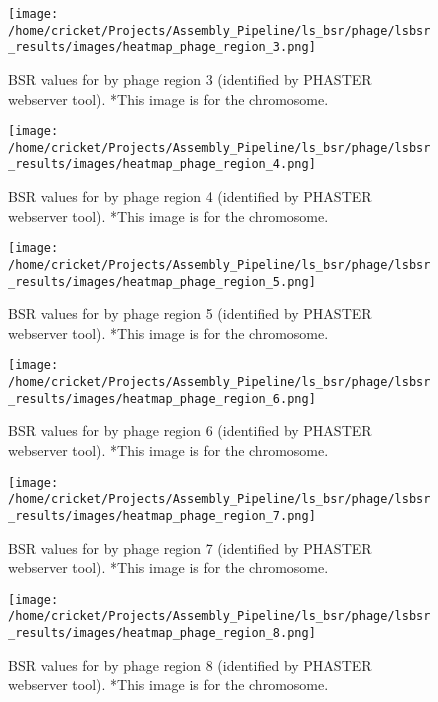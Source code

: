 \documentclass[11pt]{article}
\begin{document}
\begin{figure}[ht!]\normalsize %
\centering
\texttt{[image: /home/cricket/Projects/Assembly\_Pipeline/ls\_bsr/phage/lsbsr\_results/images/heatmap\_phage\_region\_3.png]} 
\caption{BSR values for by phage region 3 (identified by PHASTER webserver tool). *This image is for the chromosome.}
\label{phage_3}
\end{figure}

\clearpage

\begin{figure}[ht!]\normalsize %
\centering
\texttt{[image: /home/cricket/Projects/Assembly\_Pipeline/ls\_bsr/phage/lsbsr\_results/images/heatmap\_phage\_region\_4.png]} 
\caption{BSR values for by phage region 4 (identified by PHASTER webserver tool). *This image is for the chromosome.}
\label{phage_4}
\end{figure}

\begin{figure}[ht!]\normalsize %
\centering
\texttt{[image: /home/cricket/Projects/Assembly\_Pipeline/ls\_bsr/phage/lsbsr\_results/images/heatmap\_phage\_region\_5.png]} 
\caption{BSR values for by phage region 5 (identified by PHASTER webserver tool). *This image is for the chromosome.}
\label{phage_5}
\end{figure}

\clearpage

\begin{figure}[ht!]\normalsize %
\centering
\texttt{[image: /home/cricket/Projects/Assembly\_Pipeline/ls\_bsr/phage/lsbsr\_results/images/heatmap\_phage\_region\_6.png]} 
\caption{BSR values for by phage region 6 (identified by PHASTER webserver tool). *This image is for the chromosome.}
\label{phage_6}
\end{figure}

\begin{figure}[ht!]\normalsize %
\centering
\texttt{[image: /home/cricket/Projects/Assembly\_Pipeline/ls\_bsr/phage/lsbsr\_results/images/heatmap\_phage\_region\_7.png]} 
\caption{BSR values for by phage region 7 (identified by PHASTER webserver tool). *This image is for the chromosome.}
\label{phage_7}
\end{figure}

\clearpage

\begin{figure}[ht!]\normalsize %
\centering
\texttt{[image: /home/cricket/Projects/Assembly\_Pipeline/ls\_bsr/phage/lsbsr\_results/images/heatmap\_phage\_region\_8.png]} 
\caption{BSR values for by phage region 8 (identified by PHASTER webserver tool). *This image is for the chromosome.}
\label{phage_8}
\end{figure}
\end{document}
